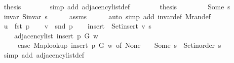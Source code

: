 \begin{isabellebody}
\ {\isacharquery}{\kern0pt}thesis\isanewline
\ \ \ \ \ \ \isamarkupfalse%
\ {\isacharparenleft}{\kern0pt}simp\ add{\isacharcolon}{\kern0pt}\ adjacency{\isacharunderscore}{\kern0pt}list{\isacharunderscore}{\kern0pt}def{\isacharparenright}{\kern0pt}\isanewline
\ \ \isamarkupfalse%
\isanewline
\ \ \isamarkupfalse%
\ \isamarkupfalse%
\ {\isacharquery}{\kern0pt}thesis\isanewline
\ \ \ \ \isacommand{{\isachardot}{\kern0pt}}\isamarkupfalse%
\isanewline
{}\isamarkupfalse%
\isanewline
\ \ \isamarkupfalse%
\ {\isacharparenleft}{\kern0pt}Some\ s{\isacharparenright}{\kern0pt}\isanewline
\ \ \isamarkupfalse%
\ invar{\isacharcolon}{\kern0pt}\ {\isachardoublequoteopen}S{\isachardot}{\kern0pt}invar\ s{\isachardoublequoteclose}\isanewline
\ \ \ \ \isamarkupfalse%
\ assms\isanewline
\ \ \ \ \isamarkupfalse%
\ {\isacharparenleft}{\kern0pt}auto\ simp\ add{\isacharcolon}{\kern0pt}\ invar{\isacharunderscore}{\kern0pt}def\ M{\isachardot}{\kern0pt}ran{\isacharunderscore}{\kern0pt}def{\isacharparenright}{\kern0pt}\isanewline
\ \ \isamarkupfalse%
\ {\isacharquery}{\kern0pt}u\ {\isacharequal}{\kern0pt}\ {\isachardoublequoteopen}fst\ p{\isachardoublequoteclose}\isanewline
\ \ \isamarkupfalse%
\ {\isacharquery}{\kern0pt}v\ {\isacharequal}{\kern0pt}\ {\isachardoublequoteopen}snd\ p{\isachardoublequoteclose}\isanewline
\ \ \isamarkupfalse%
\ {\isacharquery}{\kern0pt}insert\ {\isacharequal}{\kern0pt}\ {\isachardoublequoteopen}Set{\isacharunderscore}{\kern0pt}insert\ {\isacharquery}{\kern0pt}v\ s{\isachardoublequoteclose}\isanewline
\ \ \isamarkupfalse%
\isanewline
\ \ \ \ {\isachardoublequoteopen}adjacency{\isacharunderscore}{\kern0pt}list\ {\isacharparenleft}{\kern0pt}insert\ p\ G{\isacharparenright}{\kern0pt}\ w\ {\isacharequal}{\kern0pt}\isanewline
\ \ \ \ \ {\isacharparenleft}{\kern0pt}case\ Map{\isacharunderscore}{\kern0pt}lookup\ {\isacharparenleft}{\kern0pt}insert\ p\ G{\isacharparenright}{\kern0pt}\ w\ of\ None\ {\isasymRightarrow}\ {\isacharbrackleft}{\kern0pt}{\isacharbrackright}{\kern0pt}\ {\isacharbar}{\kern0pt}\ Some\ s\ {\isasymRightarrow}\ Set{\isacharunderscore}{\kern0pt}inorder\ s{\isacharparenright}{\kern0pt}{\isachardoublequoteclose}\isanewline
\ \ \ \ \isamarkupfalse%
\ {\isacharparenleft}{\kern0pt}simp\ add{\isacharcolon}{\kern0pt}\ adjacency{\isacharunderscore}{\kern0pt}list{\isacharunderscore}{\kern0pt}def{\isacharparenright}{\kern0pt}\isanewline

\end{isabellebody}
